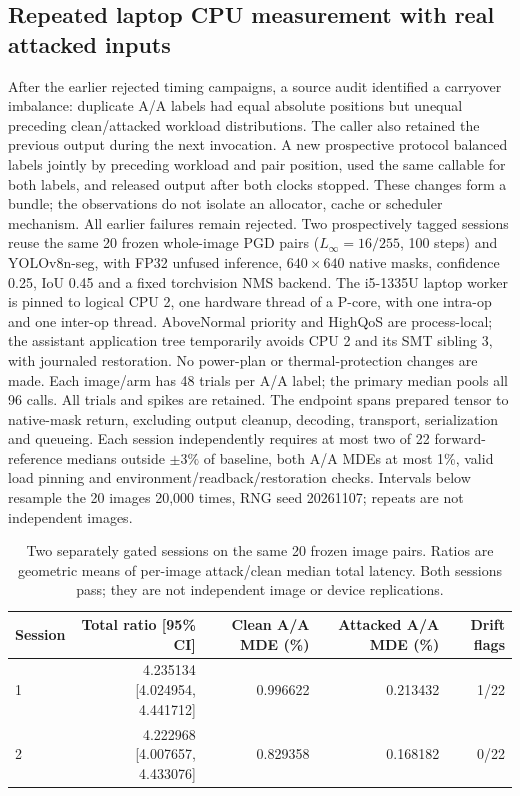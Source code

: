\subsection{Repeated laptop CPU measurement with real attacked inputs}
\label{app:seg-laptop}
After the earlier rejected timing campaigns, a source audit identified a carryover imbalance: duplicate A/A labels had equal absolute positions but unequal preceding clean/attacked workload distributions. The caller also retained the previous output during the next invocation. A new prospective protocol balanced labels jointly by preceding workload and pair position, used the same callable for both labels, and released output after both clocks stopped. These changes form a bundle; the observations do not isolate an allocator, cache or scheduler mechanism. All earlier failures remain rejected.
Two prospectively tagged sessions reuse the same 20 frozen whole-image PGD pairs ($L_\infty=16/255$, 100 steps) and YOLOv8n-seg, with FP32 unfused inference, $640\times640$ native masks, confidence 0.25, IoU 0.45 and a fixed torchvision NMS backend. The i5-1335U laptop worker is pinned to logical CPU 2, one hardware thread of a P-core, with one intra-op and one inter-op thread. AboveNormal priority and HighQoS are process-local; the assistant application tree temporarily avoids CPU 2 and its SMT sibling 3, with journaled restoration. No power-plan or thermal-protection changes are made.
Each image/arm has 48 trials per A/A label; the primary median pools all 96 calls. All trials and spikes are retained. The endpoint spans prepared tensor to native-mask return, excluding output cleanup, decoding, transport, serialization and queueing. Each session independently requires at most two of 22 forward-reference medians outside $\pm3\%$ of baseline, both A/A MDEs at most 1\%, valid load pinning and environment/readback/restoration checks. Intervals below resample the 20 images 20,000 times, RNG seed 20261107; repeats are not independent images.
\begin{table}[t]\centering
\caption{Two separately gated sessions on the same 20 frozen image pairs. Ratios are geometric means of per-image attack/clean median total latency. Both sessions pass; they are not independent image or device replications.}
\label{tab:seg-laptop}
\begin{tabular}{lrrrr}\toprule
Session & Total ratio [95\% CI] & Clean A/A MDE (\%) & Attacked A/A MDE (\%) & Drift flags\\\midrule
1 & 4.235134 [4.024954, 4.441712] & 0.996622 & 0.213432 & 1/22 \\
2 & 4.222968 [4.007657, 4.433076] & 0.829358 & 0.168182 & 0/22 \\
\bottomrule\end{tabular}\end{table}
